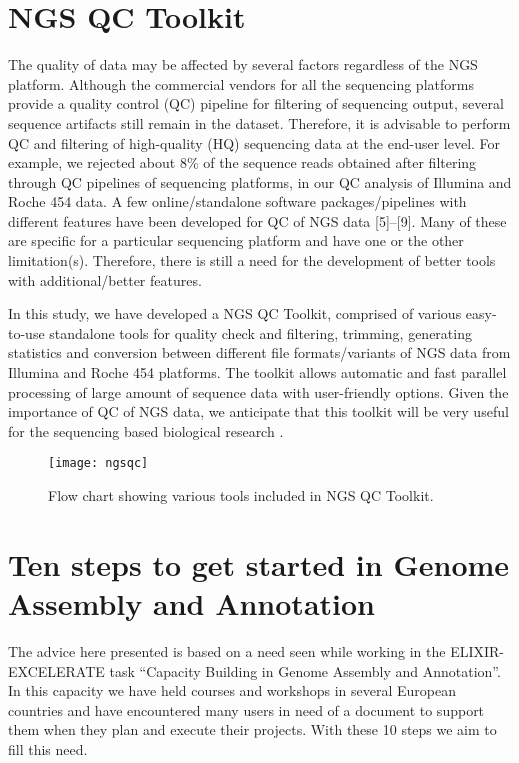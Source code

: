 \section{NGS QC Toolkit}
The quality of data may be affected by several factors regardless of the NGS platform. Although the commercial vendors for all the sequencing platforms provide a quality control (QC) pipeline for filtering of sequencing output, several sequence artifacts still remain in the dataset. Therefore, it is advisable to perform QC and filtering of high-quality (HQ) sequencing data at the end-user level. For example, we rejected about 8\% of the sequence reads obtained after filtering through QC pipelines of sequencing platforms, in our QC analysis of Illumina and Roche 454 data. A few online/standalone software packages/pipelines with different features have been developed for QC of NGS data [5]–[9]. Many of these are specific for a particular sequencing platform and have one or the other limitation(s). Therefore, there is still a need for the development of better tools with additional/better features.

In this study, we have developed a NGS QC Toolkit, comprised of various easy-to-use standalone tools for quality check and filtering, trimming, generating statistics and conversion between different file formats/variants of NGS data from Illumina and Roche 454 platforms. The toolkit allows automatic and fast parallel processing of large amount of sequence data with user-friendly options. Given the importance of QC of NGS data, we anticipate that this toolkit will be very useful for the sequencing based biological research \cite{ngs2020}.

\begin{figure}
	\centering
	\texttt{[image: ngsqc]}
	\caption{Flow chart showing various tools included in NGS QC Toolkit.}
	\label{fig:fastqc}
\end{figure}


\section{Ten steps to get started in Genome Assembly and Annotation}
The advice here presented is based on a need seen while working in the ELIXIR-EXCELERATE task “Capacity Building in Genome Assembly and Annotation”. In this capacity we have held courses and workshops in several European countries and have encountered many users in need of a document to support them when they plan and execute their projects. With these 10 steps we aim to fill this need\cite{del2018ten}.

